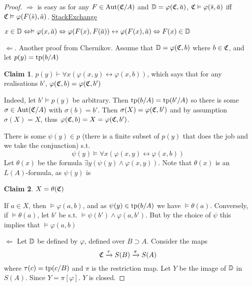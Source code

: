 \documentclass[11pt]{article}
\begin{document}
\begin{proof}
\(\Rightarrow\) is easy as for any \(F\in\operatorname{\text{Aut}}(\mathfrak{C}/A)\) and \(\D=\varphi(\fC,\bara)\), \(\fC\vDash\varphi(\bars,\bara)\)
iff \(\fC\vDash\varphi(F(\bars),\bara)\). \href{https://math.stackexchange.com/questions/3361635/when-are-automorphism-invariant-subsets-definable}{StackExchange}

\(x\in\D\Leftrightarrow\vDash\varphi(x,\bara)\Leftrightarrow\varphi(F(x),F(\bara))\leftrightarrow\varphi(F(x),\bara)\Leftrightarrow F(x)\in\D\)

\(\Leftarrow\). Another proof from Chernikov. Assume that \(\mathbb{D}=\varphi(\mathfrak{C},b)\) where \(b\in\mathfrak{C}\), and
let \(p(y)=\operatorname{tp}(b/A)\)

\textbf{Claim 1}. \(p(y)\vdash\forall x(\varphi(x,y)\leftrightarrow\varphi(x,b))\), which says that for any realisations \(b'\), \(\varphi(\mathfrak{C},b)=\varphi(\mathfrak{C},b')\)

Indeed, let \(b'\vDash p(y)\) be arbitrary. Then \(\operatorname{tp}(b/A)=\operatorname{tp}(b'/A)\) so there is
some \(\sigma\in\operatorname{\text{Aut}}(\mathfrak{C}/A)\) with \(\sigma(b)=b'\). Then \(\sigma(X)=\varphi(\mathfrak{C},b')\) and by assumption \(\sigma(X)=X\),
thus \(\varphi(\mathfrak{C},b)=X=\varphi(\mathfrak{C},b')\).

There is some \(\psi(y)\in p\) (there is a finite subset of \(p(y)\) that does the job and we take
the conjunction) s.t.
\begin{equation*}
\psi(y)\vDash\forall x(\varphi(x,y)\leftrightarrow\varphi(x,b))
\end{equation*}
Let \(\theta(x)\) be the formula \(\exists y(\psi(y)\wedge\varphi(x,y))\). Note that \(\theta(x)\) is an \(L(A)\)-formula,
as \(\psi(y)\) is

\textbf{Claim 2}. \(X=\theta(\mathfrak{C})\)

If \(a\in X\), then \(\vDash\varphi(a,b)\), and as \(\psi(y)\in\operatorname{tp}(b/A)\) we have \(\vDash\theta(a)\). Conversely,
if \(\vDash\theta(a)\), let \(b'\) be s.t. \(\vDash\psi(b')\wedge\varphi(a,b')\). But by the choice of \(\psi\) this implies that \(\vDash\varphi(a,b)\)

\(\Leftarrow\) Let \(\mathbb{D}\) be defined by \(\varphi\), defined over \(B\supset A\). Consider the maps
\begin{equation*}
\mathfrak{C}\xrightarrow{\tau}S(B)\xrightarrow{\pi}S(A)
\end{equation*}
where \(\tau(c)=\operatorname{tp}(c/B)\) and \(\pi\) is the restriction map. Let \(Y\) be the image of \(\mathbb{D}\)
in \(S(A)\). Since \(Y=\pi[\varphi]\). \(Y\) is closed.



\end{proof}
\end{document}
